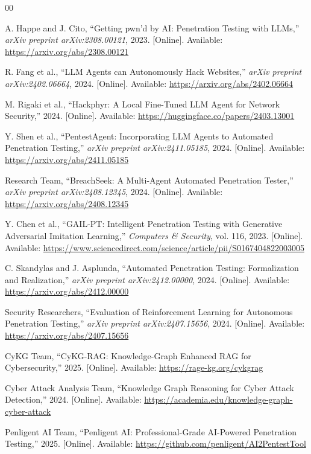 \documentclass[conference]{IEEEtran}
\begin{document}
\begin{thebibliography}{00}

A. Happe and J. Cito, ``Getting pwn'd by AI: Penetration Testing with LLMs,'' \textit{arXiv preprint arXiv:2308.00121}, 2023. [Online]. Available: \url{https://arxiv.org/abs/2308.00121}

R. Fang et al., ``LLM Agents can Autonomously Hack Websites,'' \textit{arXiv preprint arXiv:2402.06664}, 2024. [Online]. Available: \url{https://arxiv.org/abs/2402.06664}

M. Rigaki et al., ``Hackphyr: A Local Fine-Tuned LLM Agent for Network Security,'' 2024. [Online]. Available: \url{https://huggingface.co/papers/2403.13001}

Y. Shen et al., ``PentestAgent: Incorporating LLM Agents to Automated Penetration Testing,'' \textit{arXiv preprint arXiv:2411.05185}, 2024. [Online]. Available: \url{https://arxiv.org/abs/2411.05185}

Research Team, ``BreachSeek: A Multi-Agent Automated Penetration Tester,'' \textit{arXiv preprint arXiv:2408.12345}, 2024. [Online]. Available: \url{https://arxiv.org/abs/2408.12345}

Y. Chen et al., ``GAIL-PT: Intelligent Penetration Testing with Generative Adversarial Imitation Learning,'' \textit{Computers \& Security}, vol. 116, 2023. [Online]. Available: \url{https://www.sciencedirect.com/science/article/pii/S0167404822003005}

C. Skandylas and J. Asplunda, ``Automated Penetration Testing: Formalization and Realization,'' \textit{arXiv preprint arXiv:2412.00000}, 2024. [Online]. Available: \url{https://arxiv.org/abs/2412.00000}

Security Researchers, ``Evaluation of Reinforcement Learning for Autonomous Penetration Testing,'' \textit{arXiv preprint arXiv:2407.15656}, 2024. [Online]. Available: \url{https://arxiv.org/abs/2407.15656}

CyKG Team, ``CyKG-RAG: Knowledge-Graph Enhanced RAG for Cybersecurity,'' 2025. [Online]. Available: \url{https://rage-kg.org/cykgrag}

Cyber Attack Analysis Team, ``Knowledge Graph Reasoning for Cyber Attack Detection,'' 2024. [Online]. Available: \url{https://academia.edu/knowledge-graph-cyber-attack}

Penligent AI Team, ``Penligent AI: Professional-Grade AI-Powered Penetration Testing,'' 2025. [Online]. Available: \url{https://github.com/penligent/AI2PentestTool}

\end{thebibliography}
\end{document}
